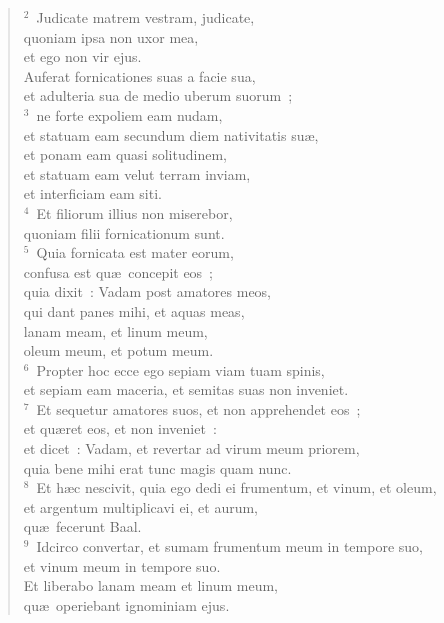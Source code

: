 \begin{flushleft}\begin{verse}\vspace{6pt}${}^{2}$~Judicate matrem vestram, judicate,\\ quoniam ipsa non uxor mea,\\ et ego non vir ejus.\\ Auferat fornicationes suas a facie sua,\\ et adulteria sua de medio uberum suorum~;\\
${}^{3}$~ne forte expoliem eam nudam,\\ et statuam eam secundum diem nativitatis su\ae ,\\ et ponam eam quasi solitudinem,\\ et statuam eam velut terram inviam,\\ et interficiam eam siti.\\
${}^{4}$~Et filiorum illius non miserebor,\\ quoniam filii fornicationum sunt.\\
${}^{5}$~Quia fornicata est mater eorum,\\ confusa est qu\ae\ concepit eos~;\\ quia dixit~: Vadam post amatores meos,\\ qui dant panes mihi, et aquas meas,\\ lanam meam, et linum meum,\\ oleum meum, et potum meum.\\
${}^{6}$~Propter hoc ecce ego sepiam viam tuam spinis,\\ et sepiam eam maceria, et semitas suas non inveniet.\\
${}^{7}$~Et sequetur amatores suos, et non apprehendet eos~;\\ et qu\ae ret eos, et non inveniet~:\\ et dicet~: Vadam, et revertar ad virum meum priorem,\\ quia bene mihi erat tunc magis quam nunc.\\
${}^{8}$~Et h\ae c nescivit, quia ego dedi ei frumentum, et vinum, et oleum,\\ et argentum multiplicavi ei, et aurum,\\ qu\ae\ fecerunt Baal.\\
${}^{9}$~Idcirco convertar, et sumam frumentum meum in tempore suo,\\ et vinum meum in tempore suo.\\ Et liberabo lanam meam et linum meum,\\ qu\ae\ operiebant ignominiam ejus.\\

\end{verse}
\end{flushleft}
